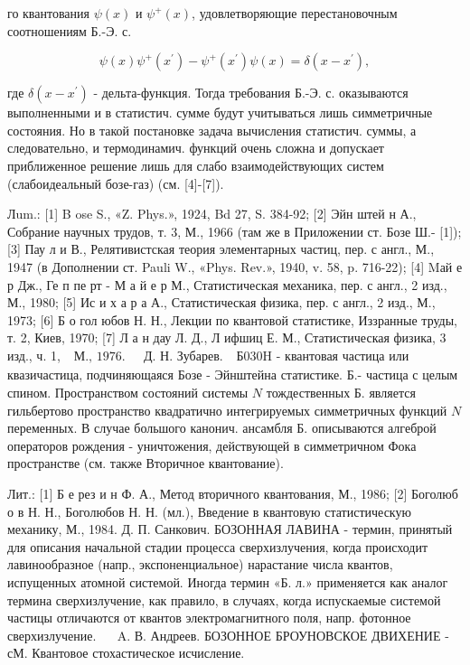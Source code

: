 \documentclass[10pt]{article}
\begin{document}
го квантования $\psi(x)$ и $\psi^{+}(x)$, удовлетворяющие перестановочным соотношениям Б.-Э. с.



\[

\psi(x) \psi^{+}\left(x^{\prime}\right)-\psi^{+}\left(x^{\prime}\right) \psi(x)=\delta\left(x-x^{\prime}\right),

\]



где $\delta\left(x-x^{\prime}\right)$ - дельта-функция. Тогда требования Б.-Э. с. оказываются выполненными и в статистич. сумме будут учитываться лишь симметричные состояния. Но в такой постановке задача вычисления статистич. суммы, а следовательно, и термодинамич. функций очень сложна и допускает приближенное решение лишь для слабо взаимодействующих систем (слабоидеальный бозе-газ) (см. [4]-[7]).



Лum.: [1] B ose S., «Z. Phys.», 1924, Bd 27, S. 384-92; [2] Эйн штей н А., Собрание научных трудов, т. 3, М., 1966 (там же в Приложении ст. Бозе Ш.- [1]); [3] Пау л и В., Релятивистская теория элементарных частиц, пер. с англ., М., 1947 (в Дополнении ст. Pauli W., «Phys. Rev.», 1940, v. 58, p. 716-22); [4] Mай е р Дж., Ге п пе рт - М а й е р М., Статистическая механика, пер. с англ., 2 изд., М., 1980; [5] Ис и х а р а А., Статистическая физика, пер. с англ., 2 изд., М., 1973; [6] Б о гол юбов Н. Н., Лекции по квантовой статистике, Иззранные труды, т. 2, Киев, 1970; [7] Л а н дау Л. Д., Л ифшиц Е. М., Статистическая физика, 3 изд., ч. 1, $\begin{array}{ll}\text { М., 1976. } & \text { Д. Н. Зубарев. }\end{array}$ Б030H - квантовая частица или квазичастица, подчиняющаяся Бозе - Эйнштейна статистике. Б.- частица с целым спином. Пространством состояний системы $N$ тождественных Б. является гильбертово пространство квадратично интегрируемых симметричных функций $N$ переменных. В случае большого канонич. ансамбля Б. описываются алгеброй операторов рождения - уничтожения, действующей в симметричном Фока пространстве (см. также Вторичное квантование).



Лит.: [1] Б е рез и н Ф. А., Метод вторичного квантования, М., 1986; [2] Боголюб о в Н. Н., Боголюбов Н. Н. (мл.), Введение в квантовую статистическую механику, М., 1984. Д. П. Санкович. БОЗОННАЯ ЛАВИНА - термин, принятый для описания начальной стадии процесса сверхизлучения, когда происходит лавинообразное (напр., экспоненциальное) нарастание числа квантов, испущенных атомной системой. Иногда термин «Б. л.» применяется как аналог термина сверхизлучение, как правило, в случаях, когда испускаемые системой частицы отличаются от квантов электромагнитного поля, напр. фотонное сверхизлучение. $\quad$ A. В. Андреев. БОЗОННОЕ БРОУНОВСКОЕ ДВИХЕНИЕ - сМ. Квантовое стохастическое исчисление.
\end{document}
